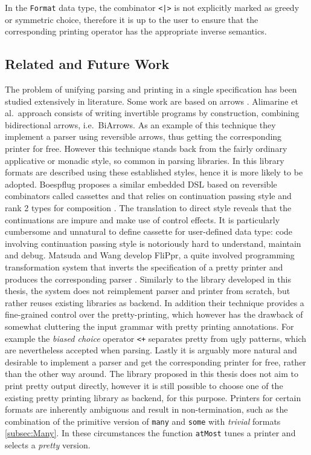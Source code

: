 \documentclass[../Thesis.tex]{subfiles}
\begin{document}
In the \texttt{Format} data type, the combinator \texttt{<|>} is not explicitly marked as greedy or symmetric choice, therefore it is up to the user to ensure that the corresponding printing operator has the appropriate inverse semantics.


\subsection{Related and Future Work}
\label{subsec:FormatRelatedWork}
The problem of unifying parsing and printing in a single specification
has been studied extensively in literature.
Some work are based on arrows \cite{Alimarine, PolyDataConv}.
Alimarine et al.\ approach consists of writing invertible programs by construction, combining bidirectional arrows, i.e.\ BiArrows.
As an example of this technique they implement a parser using reversible
arrows, thus getting the corresponding printer for free.
However this technique stands back from the fairly ordinary 
applicative or monadic style, so common in parsing libraries.
In this library formats are described using these established styles, hence it is more likely to be adopted.
Boespflug proposes a similar embedded DSL based on reversible combinators called cassettes and that relies on continuation passing style and rank 2 types 
for composition \cite{Boespflug}.
The translation to direct style reveals that the continuations are impure
and make use of control effects. It is particularly cumbersome and unnatural to define cassette for user-defined data type: code involving continuation 
passing style is notoriously hard to understand, maintain and debug.
Matsuda and Wang develop FliPpr, a quite involved programming transformation system that inverts the specification of a pretty printer and 
produces the corresponding parser \cite{FliPpr}.
Similarly to the library developed in this thesis, the system does not
reimplement parser and printer from scratch, but rather 
reuses existing libraries as backend. In addition their technique
provides a fine-grained control over the pretty-printing, which 
however has the drawback of somewhat cluttering the input grammar 
with pretty printing annotations.
For example the \emph{biased choice} operator \texttt{<+} separates 
pretty from ugly patterns, which are nevertheless accepted when
parsing. Lastly it is arguably more natural and desirable 
to implement a parser and get the corresponding printer for free, rather
than the other way around.
The library proposed in this thesis does not aim to print pretty output directly,
however it is still possible to choose one of the existing pretty printing
library \cite{Hughes95thedesign, Wadler98aprettier, SwierstraPP} as backend, for this purpose. Printers for certain formats are inherently ambiguous and
result in non-termination, such as the combination of the primitive version
of \texttt{many} and \texttt{some} with \emph{trivial} formats \ref{subsec:Many}. In these circumstances the function \texttt{atMost} 
tunes a printer and selects a \emph{pretty} version.
\end{document}
